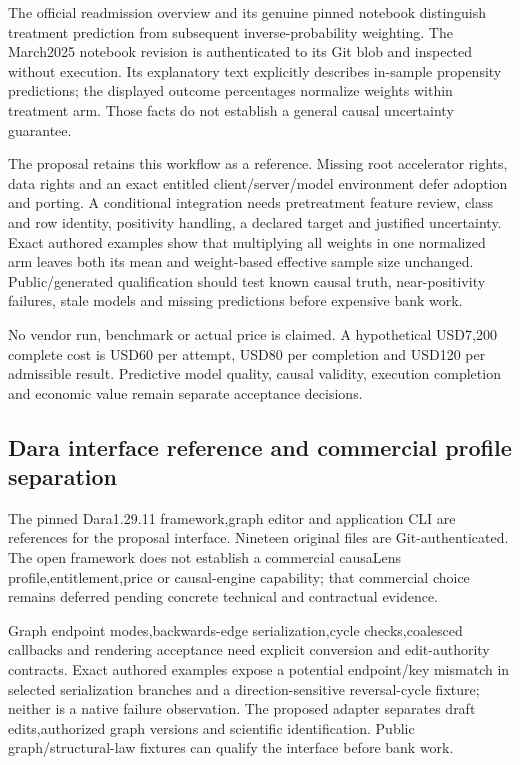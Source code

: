 The official readmission overview and its genuine pinned notebook
distinguish treatment prediction from subsequent inverse-probability
weighting. The March2025 notebook revision is authenticated to its Git
blob and inspected without execution. Its explanatory text explicitly
describes in-sample propensity predictions; the displayed outcome
percentages normalize weights within treatment arm. Those facts do not
establish a general causal uncertainty
guarantee.\citep{exec13_ch_datarobot,exec25_datarobot_notebook,exec25_datarobot_choice}

The proposal retains this workflow as a reference. Missing root
accelerator rights, data rights and an exact entitled
client/server/model environment defer adoption and porting. A
conditional integration needs pretreatment feature review, class and row
identity, positivity handling, a declared target and justified
uncertainty. Exact authored examples show that multiplying all weights
in one normalized arm leaves both its mean and weight-based effective
sample size unchanged. Public/generated qualification should test known
causal truth, near-positivity failures, stale models and missing
predictions before expensive bank
work.\citep{exec25_datarobot_notebook,exec25_datarobot_choice}

No vendor run, benchmark or actual price is claimed. A hypothetical
USD7,200 complete cost is USD60 per attempt, USD80 per completion and
USD120 per admissible result. Predictive model quality, causal validity,
execution completion and economic value remain separate acceptance
decisions.\citep{exec25_datarobot_choice}

\hypertarget{dara-interface-reference-and-commercial-profile-separation}{%
\subsection{Dara interface reference and commercial profile
separation}\label{dara-interface-reference-and-commercial-profile-separation}}

The pinned Dara1.29.11 framework,graph editor and application CLI are
references for the proposal interface. Nineteen original files are
Git-authenticated. The open framework does not establish a commercial
causaLens profile,entitlement,price or causal-engine capability; that
commercial choice remains deferred pending concrete technical and
contractual evidence.\citep{exec25_dara_source,exec25_dara_choice}

Graph endpoint modes,backwards-edge serialization,cycle checks,coalesced
callbacks and rendering acceptance need explicit conversion and
edit-authority contracts. Exact authored examples expose a potential
endpoint/key mismatch in selected serialization branches and a
direction-sensitive reversal-cycle fixture; neither is a native failure
observation. The proposed adapter separates draft edits,authorized graph
versions and scientific identification. Public graph/structural-law
fixtures can qualify the interface before bank
work.\citep{exec25_dara_source,exec25_dara_choice}

